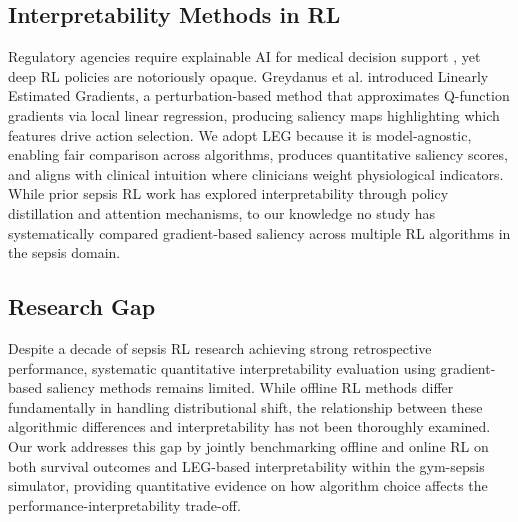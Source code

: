 \subsection{Interpretability Methods in RL}\label{sec:related:interp}

Regulatory agencies require explainable AI for medical decision support \citep{holzinger2017xai_healthcare}, yet deep RL policies are notoriously opaque. Greydanus et al. \citeyearpar{greydanus2018leg} introduced Linearly Estimated Gradients, a perturbation-based method that approximates Q-function gradients via local linear regression, producing saliency maps highlighting which features drive action selection. We adopt LEG because it is model-agnostic, enabling fair comparison across algorithms, produces quantitative saliency scores, and aligns with clinical intuition where clinicians weight physiological indicators. While prior sepsis RL work has explored interpretability through policy distillation and attention mechanisms, to our knowledge no study has systematically compared gradient-based saliency across multiple RL algorithms in the sepsis domain.


\subsection{Research Gap}\label{sec:related:gap}

Despite a decade of sepsis RL research achieving strong retrospective performance, systematic quantitative interpretability evaluation using gradient-based saliency methods remains limited. While offline RL methods differ fundamentally in handling distributional shift, the relationship between these algorithmic differences and interpretability has not been thoroughly examined. Our work addresses this gap by jointly benchmarking offline and online RL on both survival outcomes and LEG-based interpretability within the gym-sepsis simulator, providing quantitative evidence on how algorithm choice affects the performance-interpretability trade-off.

